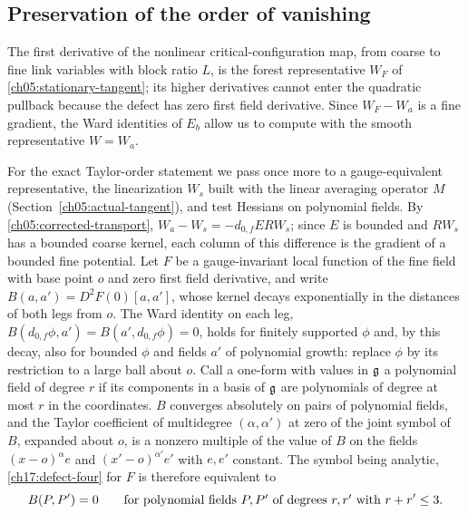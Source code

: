 \subsection{Preservation of the order of vanishing}

The first derivative of the nonlinear critical-configuration map, from coarse
to fine link variables with block ratio $L$, is the forest representative
$W_F$ of \eqref{ch05:stationary-tangent}; its higher derivatives
cannot enter the quadratic pullback because the defect has zero first
field derivative. Since $W_F-W_a$ is a fine gradient, the Ward identities
of $E_b$ allow us to compute with the smooth representative $W=W_a$.

For the exact Taylor-order statement we pass once more to a gauge-equivalent representative, the linearization $W_s$ built with the linear averaging operator $M$ (Section~\ref{ch05:actual-tangent}), and test Hessians on polynomial fields. By \eqref{ch05:corrected-transport}, $W_a-W_s=-d_{0,f}ERW_s$; since $E$ is bounded and $RW_s$ has a bounded coarse kernel, each column of this difference is the gradient of a bounded fine potential. Let $F$ be a gauge-invariant local function of the fine field with base point $o$ and zero first field derivative, and write $B(a,a')=D^2F(0)[a,a']$, whose kernel decays exponentially in the distances of both legs from $o$.
The Ward identity on each leg, $B(d_{0,f}\phi,a')=B(a',d_{0,f}\phi)=0$, holds for finitely supported $\phi$ and, by this decay, also for bounded $\phi$ and fields $a'$ of polynomial growth: replace $\phi$ by its restriction to a large ball about $o$. Call a one-form with values in $\mathfrak g$ a polynomial field of degree $r$ if its components in a basis of $\mathfrak g$ are polynomials of degree at most $r$ in the coordinates. $B$ converges absolutely on pairs of polynomial fields, and the Taylor coefficient of multidegree $(\alpha,\alpha')$ at zero of the joint symbol of $B$, expanded about $o$, is a nonzero multiple of the value of $B$ on the fields $(x-o)^\alpha e$ and $(x'-o)^{\alpha'}e'$ with $e,e'$ constant. The symbol being analytic, \eqref{ch17:defect-four} for $F$ is therefore equivalent to
\begin{equation}
 B(P,P')=0\qquad\hbox{for polynomial fields $P,P'$ of degrees $r,r'$ with }r+r'\le3.
 \label{ch17:polynomial-four}
\end{equation}
